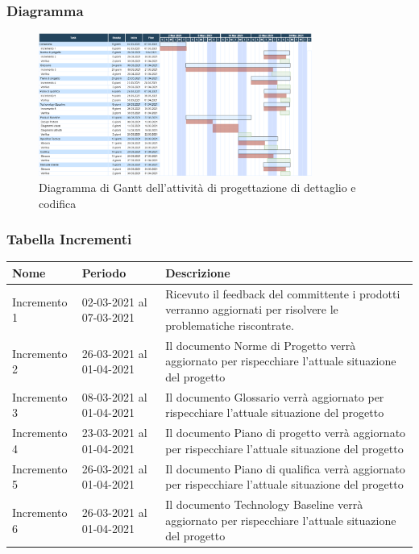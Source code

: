 	\subsubsection{Diagramma}
		\begin{figure}[H]
        		\centering
        		\includegraphics[width=0.8\textwidth]{source/img/Progettazionedettaglio_codifica.png}
        		\caption{Diagramma di Gantt dell'attività di progettazione di dettaglio e codifica}
    		\end{figure}
	\subsubsection{Tabella Incrementi}
		\begin{center}
    			\begin{tabular}{ | l | p{5cm} | p{8cm} |}
   			 \hline
    			Nome & Periodo & Descrizione \\ \hline
    			Incremento 1 & 02-03-2021 al 07-03-2021 & Ricevuto il feedback del committente i prodotti verranno aggiornati per risolvere le problematiche riscontrate. \\ \hline
    			Incremento 2 & 26-03-2021 al 01-04-2021 & Il documento Norme di Progetto verrà aggiornato per rispecchiare l'attuale situazione del progetto \\ \hline
    			Incremento 3 & 08-03-2021 al 01-04-2021 & Il documento Glossario verrà aggiornato per rispecchiare l'attuale situazione del progetto \\ \hline
			Incremento 4 & 23-03-2021 al 01-04-2021 & Il documento Piano di progetto verrà aggiornato per rispecchiare l'attuale situazione del progetto \\ \hline
			Incremento 5 & 26-03-2021 al 01-04-2021 & Il documento Piano di qualifica verrà aggiornato per rispecchiare l'attuale situazione del progetto \\ \hline
			Incremento 6 & 26-03-2021 al 01-04-2021 & Il documento Technology Baseline verrà aggiornato per rispecchiare l'attuale situazione del progetto \\ \hline
    			\end{tabular}
		\end{center}

